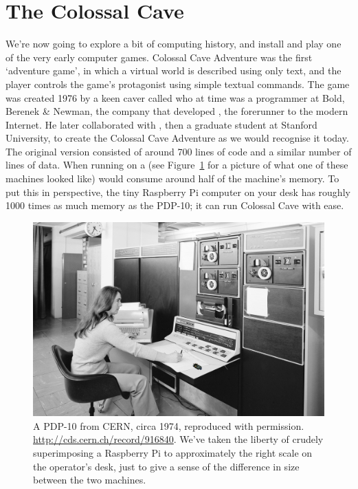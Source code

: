 \section{The Colossal Cave}

We're now going to explore a bit of computing history, and install and play one of the very early computer games. Colossal Cave Adventure was the first `adventure game', in which a virtual world is described using only text, and the player controls the game's protagonist using simple textual commands. The game was created 1976 by a keen caver called  who at time was a programmer at Bold, Berenek \& Newman, the company that developed , the forerunner to the modern Internet. He later collaborated with , then a graduate student at Stanford University, to create the Colossal Cave Adventure as we would recognise it today. The original version consisted of around 700 lines of  code and a similar number of lines of data. When running on a  (see Figure~\ref{figure:cern-pdp-10} for a picture of what one of these machines looked like) would consume around half of the machine's memory. To put this in perspective, the tiny Raspberry Pi computer on your desk has roughly 1000 times as much memory as the PDP-10; it can run Colossal Cave with ease. 

\begin{figure}[t]
\centerline{\includegraphics[width=14cm]{images/cern-pdp10+pi.png}}
\caption{A PDP-10 from CERN, circa 1974, reproduced with permission. \url{http://cds.cern.ch/record/916840}. We've taken the liberty of crudely superimposing a Raspberry Pi to approximately the right scale on the operator's desk, just to give a sense of the difference in size between the two machines.}\label{figure:cern-pdp-10}
\end{figure}


